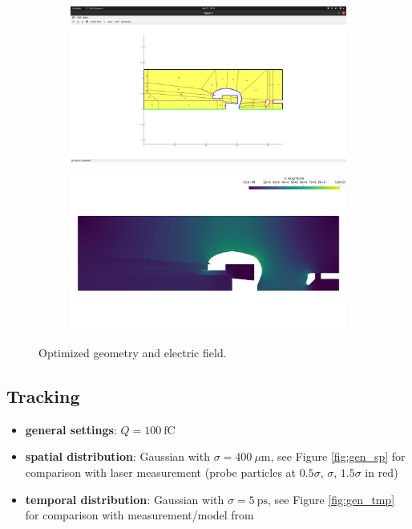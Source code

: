 \begin{center}
\begin{figure}[H]
   \begin{subfigure}{0.45\textwidth}
      \includegraphics[width=\textwidth]{fig/geometry_v6_opt_order=3_run2}
   \end{subfigure}
   \begin{subfigure}{0.45\textwidth}
      \includegraphics[width=\textwidth]{fig/E_v6_opt_order=3_run2}
   \end{subfigure}
   \caption{Optimized geometry and electric field.}
   \label{fig:opt}
\end{figure}
\end{center}

\subsection{Tracking}
\begin{itemize}
   \item \textbf{general settings}: $Q=100\ \mathrm{fC}$
   \item \textbf{spatial distribution}: Gaussian with $\sigma=400\ \mu\mathrm{m}$, see Figure \ref{fig:gen_sp} for comparison with laser measurement (probe particles at $0.5\sigma$, $\sigma$, $1.5\sigma$ in red)
   \item \textbf{temporal distribution}: Gaussian with $\sigma=5\ \mathrm{ps}$, see Figure \ref{fig:gen_tmp} for comparison with measurement/model from \cite{wagner}
\end{itemize}

